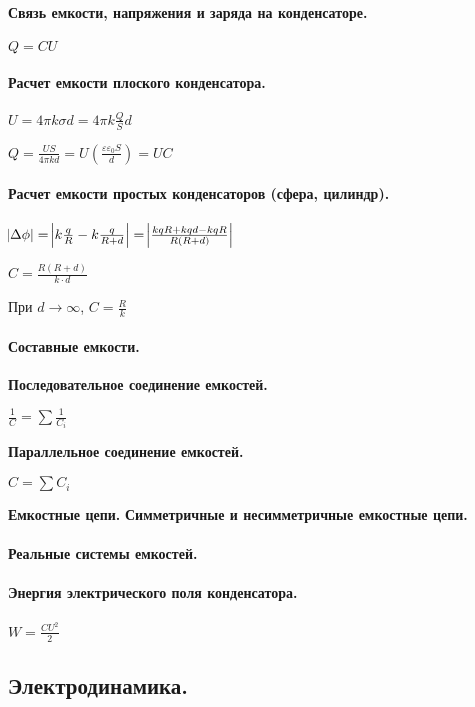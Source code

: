 \documentclass{article}
\begin{document}
            \paragraph{Связь емкости, напряжения и заряда на конденсаторе.}
                \(Q = CU\)
            \paragraph{Расчет емкости плоского конденсатора.}
                \(U = 4\pi k\sigma d = 4\pi k \frac{Q}{S}d\)

                \(Q = \frac{US}{4\pi kd} = U(\frac{\varepsilon\varepsilon_0 S}{d}) = UC\)
            \paragraph{Расчет емкости простых конденсаторов (сфера, цилиндр).}
                \(\abs{\Delta \phi} = \abs{k\frac{q}{R} - k\frac{q}{R+d}} = \abs{\frac{kqR+kqd-kqR}{R(R+d)}}\)

                \(C = \frac{R(R+d)}{k\cdot d}\)

                При \(d\to\infty\), \(C = \frac{R}{k}\)
            \paragraph{Составные емкости.}
                \textbf{Последовательное соединение емкостей.}
                    
                \(\frac{1}{C} = \sum{\frac{1}{C_i}}\)

                \textbf{Параллельное соединение емкостей.}
                
                \(C = \sum{C_i}\)

                \textbf{Емкостные цепи.}
                \textbf{Симметричные и несимметричные емкостные цепи.}
            \paragraph{Реальные системы емкостей.}
            \paragraph{Энергия электрического поля конденсатора.}
                \(W = \frac{CU^2}{2}\)
        \subsection{Электродинамика.}
\end{document}
